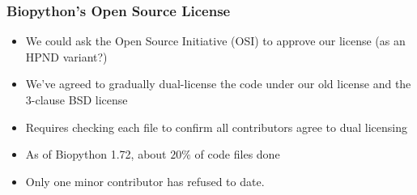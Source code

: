 \begin{frame}
\frametitle{Biopython's Open Source License}
\begin{itemize}
\item We could ask the Open Source Initiative (OSI)
    to approve our license (as an HPND variant?)
\item We've agreed to gradually dual-license the code
    under our old license and the 3-clause BSD license
\item Requires checking each file to confirm all
    contributors agree to dual licensing
\item As of Biopython 1.72, about $20\%$ of code files done
\item Only one minor contributor has refused to date.
\end{itemize}
\end{frame}





